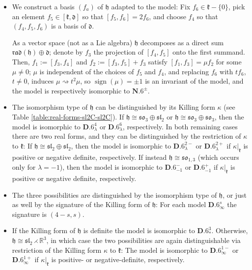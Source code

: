 \documentclass[10pt,a4paper]{amsart}
\DeclareMathOperator{\sign}{sign}
\newcommand{\bbR}{\mathbb{R}}
\newcommand{\mfd} {\mathfrak{d}}
\newcommand{\mfh} {\mathfrak{h}}
\newcommand{\mfk} {\mathfrak{k}}
\newcommand{\mfrad}{\mathfrak{rad}}
\newcommand{\mfsl} {\mathfrak{sl}}
\newcommand{\mfso} {\mathfrak{so}}
\numberwithin{equation}{section}
\begin{document}
\begin{itemize}[leftmargin=1.5cm]\itemsep=0pt
\item[\textbf{$\mathbf{N.6}$}] We construct a basis $(f_a)$ of $\mfh$ adapted to the model: Fix $f_6 \in \mfk - \{ 0 \}$, pick an element $f_5 \in [\mfk, \mfd]$ so that $[f_5, f_6] = 2 f_6$, and choose $f_4$ so that $(f_4, f_5, f_6)$ is a basis of $\mfd$.

As a vector space (not as a Lie algebra) $\mfh$ decomposes as a direct sum $\mfrad(\mfh) \oplus \mfd$; denote by $f_3$ the projection of $[f_4, f_5]$ onto the first summand. Then, $f_1 := [f_3, f_4]$ and $f_2 := [f_3, f_5] + f_3$ satisfy $[f_1, f_3] = \mu f_2$ for some $\mu \neq 0$; $\mu$ is independent of the choices of $f_5$ and $f_4$, and replacing $f_6$ with $t f_6$, $t \neq 0$, induces $\mu \rightsquigarrow t^2 \mu$, so $\sign(\mu) = \pm 1$ is an invariant of the model, and the model is respectively isomorphic to $\mathbf{N.6}^{\pm}$.

\item[\textbf{$\mathbf{D.6}_{\lambda}$}] The isomorphism type of $\mfh$ can be distinguished by its Killing form $\kappa$ (see Table \ref{table:real-forms-sl2C-sl2C}). If $\mfh \cong \mfso_3 \oplus \mfsl_2$ or $\mfh \cong \mfso_3 \oplus \mfso_3$, then the model is isomorphic to $\mathbf{D.6}_{\lambda}^4$ or $\mathbf{D.6}_{\lambda}^6$, respectively. In both remaining cases there are two real forms, and they can be distinguished by the restriction of $\kappa$ to $\mfk$: If $\mfh \cong \mfsl_2 \oplus \mfsl_2$, then the model is isomorphic to $\mathbf{D.6}_{\lambda}^{2-}$ or $\mathbf{D.6}_{\lambda}^{2+}$ if $\kappa\vert_{\mfk}$ is positive or negative definite, respectively. If instead $\mfh \cong \mfso_{1, 3}$ (which occurs only for $\lambda = -1$), then the model is isomorphic to $\mathbf{D.6}_{-1}^-$ or $\mathbf{D.6}_{-1}^+$ if $\kappa\vert_{\mfk}$ is positive or negative definite, respectively.

\item[\textbf{$\mathbf{D.6}_{\infty}$}] The three possibilities are distinguished by the isomorphism type of $\mfh$, or just as well by the signature of the Killing form of $\mfh$: For each model $\mathbf{D.6}_{\infty}^s$ the signature is $(4 - s, s)$.

\item[\textbf{$\mathbf{D.6}_{\ast}$}] If the Killing form of $\mfh$ is definite the model is isomorphic to $\mathbf{D.6}_{\ast}^3$. Otherwise, $\mfh \cong \mfsl_2 \rightthreetimes \bbR^3$, in which case the two possibilities are again distinguishable via restriction of the Killing form $\kappa$ to $\mfk$: The model is isomorphic to $\mathbf{D.6}_{\infty}^{1-}$ or $\mathbf{D.6}_{\infty}^{1+}$ if $\kappa\vert_{\mfk}$ is positive- or negative-definite, respectively.
\end{itemize}
\end{document}
